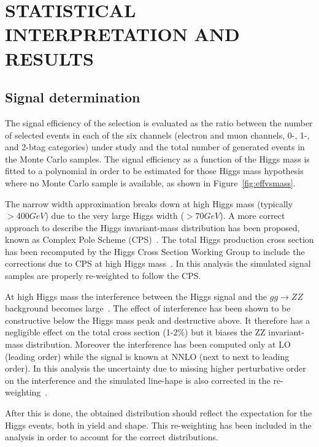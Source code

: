 

\chapter{STATISTICAL INTERPRETATION AND RESULTS}
\label{sec:results}

\section{Signal determination}
The signal efficiency of the selection is evaluated as the ratio between the number of selected events in each of the six channels (electron and muon channels, 0-, 1-, and 2-btag categories) under study and the total number of generated events in the Monte Carlo samples.  The signal efficiency as a function of the Higgs mass is fitted to a polynomial in order to be estimated for those Higgs mass hypothesis where no Monte Carlo sample is available, 
as shown in Figure~\ref{fig:effvsmass}.

The narrow width approximation breaks down at high Higgs mass (typically $>400 GeV$) due to the very large Higgs width ($>70 GeV$). 
A more correct approach to describe the Higgs invariant-mass distribution has been proposed, known as Complex Pole Scheme (CPS)~\cite{Goria:2011wa}.
The total Higgs production cross section has been recomputed by the Higgs Cross Section Working Group to include the corrections due to CPS at high Higgs mass~\cite{LHC-HCS}.  In this analysis the simulated signal samples are properly re-weighted to follow the CPS.

At high Higgs mass the interference between the Higgs signal and the $gg\rightarrow ZZ$ background becomes large~\cite{Passarino:2012ri}.  The effect of interference has been shown to be constructive below the Higgs mass peak and destructive above. It therefore has a negligible effect on the total cross section (1-2\%) but it biases the ZZ invariant-mass distribution. Moreover the interference has been computed only at LO (leading order) while the signal is known at NNLO (next to next to leading order). In this analysis the uncertainty due to missing higher perturbative order on the interference and the simulated line-hape is also corrected in the re-weighting~\cite{Passarino:2012ri}.

After this is done, the obtained distribution should reflect the expectation for the Higgs events, both in yield and shape. This re-weighting has been included in the analysis in order to account for the correct distributions.

